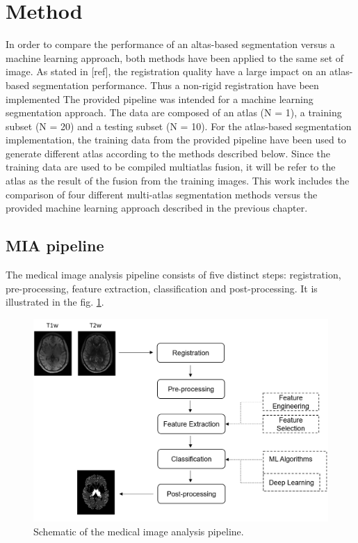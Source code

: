 \section*{Method}
In order to compare the performance of an altas-based segmentation versus a machine learning approach, both methods have been applied to the same set of image. As stated in [ref], the registration quality have a large impact on an atlas-based segmentation performance. Thus a non-rigid registration have been implemented 
The provided pipeline was intended for a machine learning segmentation approach. The data are composed of an atlas (N = 1), a training subset (N = 20) and a testing subset (N = 10). For the atlas-based segmentation implementation, the training data from the provided pipeline have been used to generate different atlas according to the methods described below. Since the training data are used to be compiled multiatlas fusion, it will be refer to the atlas as the result of the fusion from the training images. This work includes the comparison of four different multi-atlas segmentation methods versus the provided machine learning approach described in the previous chapter.


\subsection*{MIA pipeline} \label{sec:MIApipeline}
The medical image analysis pipeline consists of five distinct steps: registration, pre-processing, feature extraction, classification and post-processing. It is illustrated in the fig. \ref{fig:pipeline}.

\begin{figure}[h!]
	\centering
	\includegraphics[width = .45 \textwidth]{img/pipeline2}
	\caption{Schematic of the medical image analysis pipeline.}
	\label{fig:pipeline}
\end{figure}

